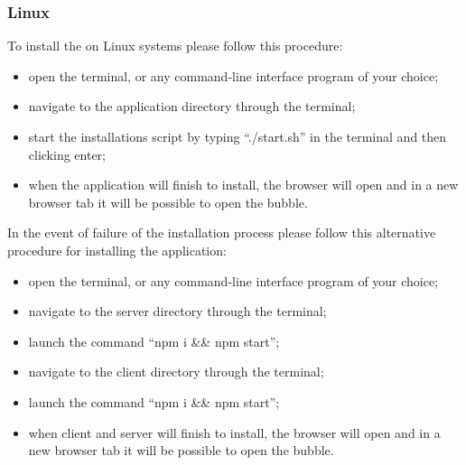 \subsubsection{Linux}
To install the \DemoName{} on Linux systems please follow this procedure:
\begin{itemize}
	\item open the terminal, or any command-line interface program of your choice;
	\item navigate to the application directory through the terminal; 
	\item start the installations script by typing ``./start.sh'' in the terminal and then clicking enter;
	\item when the application will finish to install, the browser will open and in a new browser tab it will be possible to open the bubble.
\end{itemize}

In the event of failure of the installation process please follow this alternative procedure for installing the application:
\begin{itemize}
	\item open the terminal, or any command-line interface program of your choice;
	\item navigate to the server directory through the terminal;
	\item launch the command ``npm i \&\& npm start'';
	\item navigate to the client directory through the terminal;
	\item launch the command ``npm i \&\& npm start'';
	\item when client and server will finish to install, the browser will open and in a new browser tab it will be possible to open the bubble.
\end{itemize}

